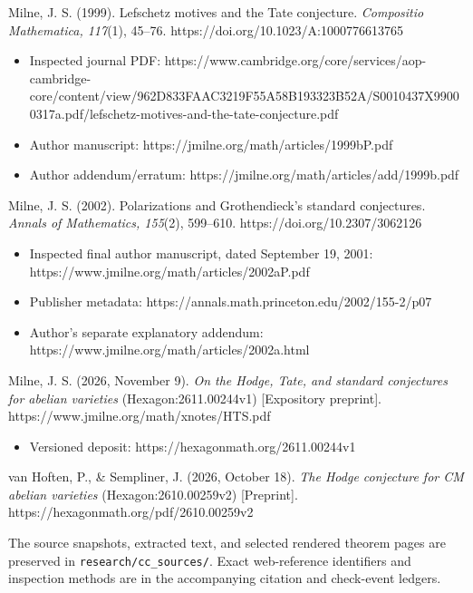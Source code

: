 Milne, J. S. (1999). Lefschetz motives and the Tate conjecture.
\emph{Compositio Mathematica, 117}(1), 45--76.
https://doi.org/10.1023/A:1000776613765

\begin{itemize}
\tightlist
\item
  Inspected journal PDF:
  https://www.cambridge.org/core/services/aop-cambridge-core/content/view/962D833FAAC3219F55A58B193323B52A/S0010437X99000317a.pdf/lefschetz-motives-and-the-tate-conjecture.pdf
\item
  Author manuscript: https://jmilne.org/math/articles/1999bP.pdf
\item
  Author addendum/erratum:
  https://jmilne.org/math/articles/add/1999b.pdf
\end{itemize}

Milne, J. S. (2002). Polarizations and Grothendieck's standard
conjectures. \emph{Annals of Mathematics, 155}(2), 599--610.
https://doi.org/10.2307/3062126

\begin{itemize}
\tightlist
\item
  Inspected final author manuscript, dated September 19, 2001:
  https://www.jmilne.org/math/articles/2002aP.pdf
\item
  Publisher metadata: https://annals.math.princeton.edu/2002/155-2/p07
\item
  Author's separate explanatory addendum:
  https://www.jmilne.org/math/articles/2002a.html
\end{itemize}

Milne, J. S. (2026, November 9). \emph{On the Hodge, Tate, and standard
conjectures for abelian varieties} (Hexagon:2611.00244v1) {[}Expository
preprint{]}. https://www.jmilne.org/math/xnotes/HTS.pdf

\begin{itemize}
\tightlist
\item
  Versioned deposit: https://hexagonmath.org/2611.00244v1
\end{itemize}

van Hoften, P., \& Sempliner, J. (2026, October 18). \emph{The Hodge
conjecture for CM abelian varieties} (Hexagon:2610.00259v2)
{[}Preprint{]}. https://hexagonmath.org/pdf/2610.00259v2

The source snapshots, extracted text, and selected rendered theorem
pages are preserved in \texttt{research/cc\_sources/}. Exact
web-reference identifiers and inspection methods are in the accompanying
citation and check-event ledgers.
